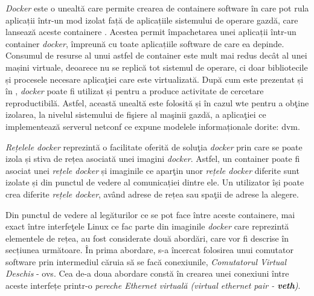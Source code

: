 \textit{Docker} este o unealtă care permite crearea de containere software în care pot rula aplicații într-un mod izolat față de aplicațiile sistemului de operare gazdă, care lansează aceste containere \cite{merkel2014docker}. Acestea permit împachetarea unei aplicații într-un container \textit{docker}, împreună cu toate aplicațiile software de care ea depinde. Consumul de resurse al unui astfel de container este mult mai redus decât al unei mașini virtuale, deoarece nu se replică tot sistemul de operare, ci doar bibliotecile și procesele necesare aplicaţiei care este virtualizată. După cum este prezentat și în \cite{chamberlain2014using}, \textit{docker} poate fi utilizat și pentru a produce activitate de cercetare reproductibilă. Astfel, această unealtă este folosită și în cazul \gls{wte} pentru a obţine izolarea, la nivelul sistemului de fişiere al maşinii gazdă, a aplicaţiei ce implementează serverul \gls{netconf} ce expune modelele informaționale dorite: \gls{dvm}.

\textit{Rețelele docker} reprezintă o facilitate oferită de soluţia \textit{docker} prin care se poate izola și stiva de rețea asociată unei imagini \textit{docker}. Astfel, un container poate fi asociat unei \textit{rețele docker} și imaginile ce aparţin unor \textit{rețele docker} diferite sunt izolate și din punctul de vedere al comunicației dintre ele. Un utilizator își poate crea diferite \textit{rețele docker}, având adrese de rețea sau spaţii de adrese la alegere.

Din punctul de vedere al legăturilor ce se pot face între aceste containere, mai exact între interfeţele Linux ce fac parte din imaginile \textit{docker} care reprezintă elementele de rețea, au fost considerate două abordări, care vor fi descrise în secțiunea următoare. În prima abordare, s-a încercat folosirea unui comutator software prin intermediul căruia să se facă conexiunile, \textit{Comutatorul Virtual Deschis} - \gls{ovs}. Cea de-a doua abordare constă în crearea unei conexiuni între aceste interfețe printr-o \textit{pereche Ethernet virtuală (virtual ethernet pair - \textbf{veth})}. %


